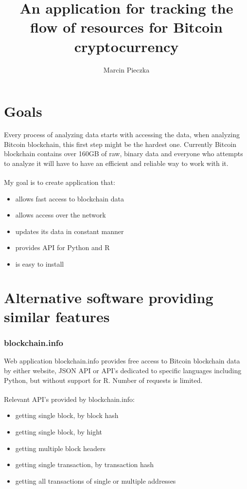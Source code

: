 \documentclass{article}
\begin{document}
\title{
	An application for tracking the flow of resources for Bitcoin cryptocurrency \\
}
\date{}
\author{Marcin Pieczka}
\maketitle

\section{Goals}
Every process of analyzing data starts with accessing the data, when analyzing Bitcoin blockchain, this first step might be the hardest one. Currently Bitcoin blockchain contains over 160GB of raw, binary data and everyone who attempts to analyze it will have to have an efficient and reliable way to work with it.
\\
\\
My goal is to create application that: 
\begin{itemize}

\item
allows fast access to blockchain data
\item
allows access over the network
\item
updates its data in constant manner
\item
provides API for Python and R
\item
is easy to install

\end{itemize}

\section{Alternative software providing similar features}
\subsubsection*{blockchain.info}

Web application blockchain.info provides free access to Bitcoin blockchain data by either website, JSON API or API's dedicated to specific languages including Python, but without support for R. Number of requests is limited.
\\
\\
Relevant API's provided by blockchain.info:
\begin{itemize}
\item
getting single block, by block hash
\item
getting single block, by hight
\item
getting multiple block headers
\item
getting single transaction, by transaction hash
\item
getting all transactions of single or multiple addresses


\end{itemize}
\end{document}

